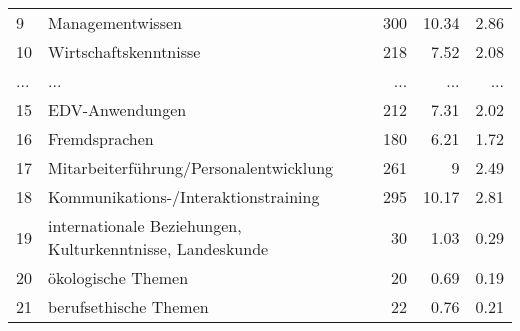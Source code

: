 \begin{longtable}{lXrrr}
        9 & \multicolumn{1}{X}{Managementwissen} & %
          \num{300} &
          \num[round-mode=places,round-precision=2]{10,34} &
          \num[round-mode=places,round-precision=2]{2,86} \\
        10 & \multicolumn{1}{X}{Wirtschaftskenntnisse} & %
          \num{218} &
          \num[round-mode=places,round-precision=2]{7,52} &
          \num[round-mode=places,round-precision=2]{2,08} \\
       ... & ... & ... & ... & ... \\
        15 & \multicolumn{1}{X}{EDV-Anwendungen} & %
          \num{212} &
          \num[round-mode=places,round-precision=2]{7,31} &
          \num[round-mode=places,round-precision=2]{2,02} \\

        16 & \multicolumn{1}{X}{Fremdsprachen} & %
          \num{180} &
          \num[round-mode=places,round-precision=2]{6,21} &
          \num[round-mode=places,round-precision=2]{1,72} \\

        17 & \multicolumn{1}{X}{Mitarbeiterführung/Personalentwicklung} & %
          \num{261} &
          \num[round-mode=places,round-precision=2]{9} &
          \num[round-mode=places,round-precision=2]{2,49} \\

        18 & \multicolumn{1}{X}{Kommunikations-/Interaktionstraining} & %
          \num{295} &
          \num[round-mode=places,round-precision=2]{10,17} &
          \num[round-mode=places,round-precision=2]{2,81} \\

        19 & \multicolumn{1}{X}{internationale Beziehungen, Kulturkenntnisse, Landeskunde} & %
          \num{30} &
          \num[round-mode=places,round-precision=2]{1,03} &
          \num[round-mode=places,round-precision=2]{0,29} \\

        20 & \multicolumn{1}{X}{ökologische Themen} & %
          \num{20} &
          \num[round-mode=places,round-precision=2]{0,69} &
          \num[round-mode=places,round-precision=2]{0,19} \\

        21 & \multicolumn{1}{X}{berufsethische Themen} & %
          \num{22} &
          \num[round-mode=places,round-precision=2]{0,76} &
          \num[round-mode=places,round-precision=2]{0,21} \\


\end{longtable}
